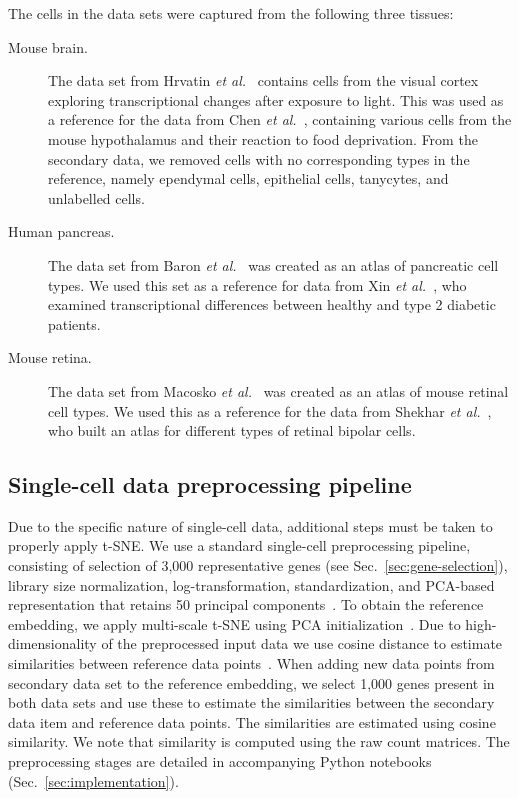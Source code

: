 \documentclass[runningheads]{llncs}
\newcommand{\etal}{\textit{et al.}}
\begin{document}
The cells in the data sets were captured from the following three tissues:
\begin{description}
\item[Mouse brain.] The data set from Hrvatin \etal~\cite{hrvatin2018} contains
cells from the visual cortex exploring transcriptional changes after exposure
to light. This was used as a reference for the data from Chen
\etal~\cite{chen2017}, containing various cells from the mouse hypothalamus and
their reaction to food deprivation. From the secondary data, we removed cells
with no corresponding types in the reference, namely ependymal cells,
epithelial cells, tanycytes, and unlabelled cells.

\item[Human pancreas.] The data set from Baron \etal~\cite{baron2016} was
created as an atlas of pancreatic cell types. We used this set as a reference
for data from Xin \etal~\cite{xin2016}, who examined transcriptional
differences between healthy and type 2 diabetic patients.

\item[Mouse retina.] The data set from Macosko \etal~\cite{macosko2015} was
created as an atlas of mouse retinal cell types. We used this as a reference
for the data from Shekhar \etal~\cite{shekhar2016}, who built an atlas for
different types of retinal bipolar cells.
\end{description}

\subsection{Single-cell data preprocessing pipeline}

Due to the specific nature of single-cell data, additional steps must be taken
to properly apply t-SNE. We use a standard single-cell preprocessing pipeline,
consisting of selection of 3,000 representative genes (see
Sec.~\ref{sec:gene-selection}), library size normalization, log-transformation,
standardization, and PCA-based representation that retains 50 principal
components~\cite{seurat,scanpy}. To obtain the reference embedding, we apply
multi-scale t-SNE using PCA initialization~\cite{art_of_using_tsne}. Due to
high-dimensionality of the preprocessed input data we use cosine distance to
estimate similarities between reference data points~\cite{Domingos2012-CACM}.
When adding new data points from secondary data set to the reference embedding,
we select 1,000 genes present in both data sets and use these to estimate the
similarities between the secondary data item and reference data points. The
similarities are estimated using cosine similarity. We note that similarity is
computed using the raw count matrices. The preprocessing stages are detailed in
accompanying Python notebooks (Sec.~\ref{sec:implementation}).
\end{document}
